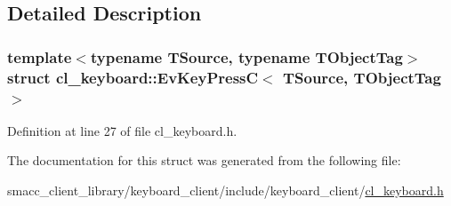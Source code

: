 \subsection{Detailed Description}
\subsubsection*{template$<$typename T\+Source, typename T\+Object\+Tag$>$\newline
struct cl\+\_\+keyboard\+::\+Ev\+Key\+Press\+C$<$ T\+Source, T\+Object\+Tag $>$}



Definition at line 27 of file cl\+\_\+keyboard.\+h.



The documentation for this struct was generated from the following file\+:\begin{DoxyCompactItemize}
\item 
smacc\+\_\+client\+\_\+library/keyboard\+\_\+client/include/keyboard\+\_\+client/\hyperlink{cl__keyboard_8h}{cl\+\_\+keyboard.\+h}\end{DoxyCompactItemize}
